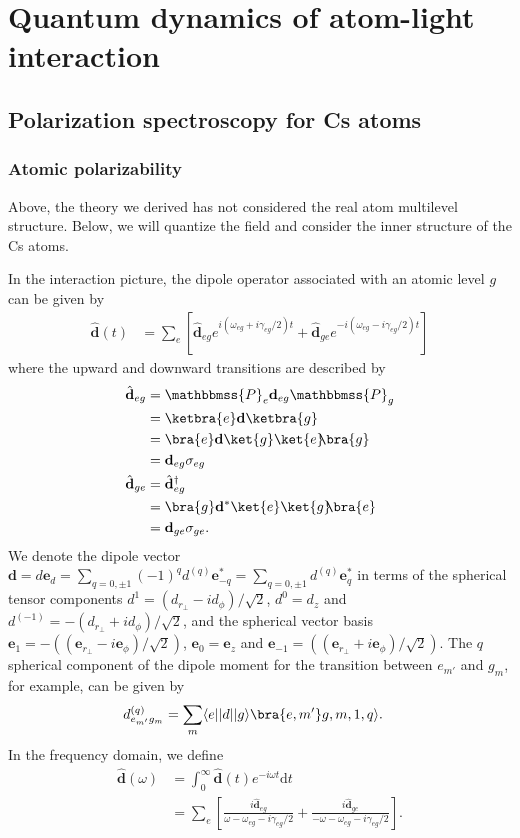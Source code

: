 \chapter{Quantum dynamics of atom-light interaction}

\section{Polarization spectroscopy for Cs atoms}
\subsection{Atomic polarizability}
Above, the theory we derived has not considered the real atom multilevel structure. Below, we will quantize the field and consider the inner structure of the Cs atoms.

In the interaction picture, the dipole operator associated with an atomic level $ g $ can be given by
\begin{align}\label{eq:dtop}
\hat{\mathbf{d}}(t) &= \sum_e \left[ \hat{\mathbf{d}}_{eg}e^{i(\omega_{eg}+i\gamma_{eg}/2)t} + \hat{\mathbf{d}}_{ge}e^{-i(\omega_{eg}-i\gamma_{eg}/2)t}\right]
\end{align}
where the upward and downward transitions are described by
\begin{align}
\hat{\mathbf{d}}_{eg} &= \mathbbmss{P}_e\mathbf{d}_{eg}\mathbbmss{P}_g\\
&= \ketbra{e} \mathbf{d}\ketbra{g}\\
&= \bra{e} \mathbf{d}\ket{g} \ket{e}\!\!\bra{g}\\
&= \mathbf{d}_{eg} \sigma_{eg}\\
\hat{\mathbf{d}}_{ge} &=\hat{\mathbf{d}}_{eg}^\dagger \\
&= \bra{g} \mathbf{d}^*\ket{e} \ket{g}\!\!\bra{e}\\
&= \mathbf{d}_{ge}\sigma_{ge}.
\end{align}
We denote the dipole vector $ \mathbf{d}=d\mathbf{e}_d=\sum_{q=0,\pm 1} (-1)^qd^{(q)}\mathbf{e}^*_{-q}=\sum_{q=0,\pm 1} d^{(q)}\mathbf{e}^*_{q} $ in terms of the spherical tensor components $ d^1=(d_{r\!_\perp}-id_{\phi})/\sqrt{2} $, $ d^0=d_z $ and $ d^{(-1)} =-(d_{r\!_\perp}+id_{\phi})/\sqrt{2} $, and the spherical vector basis $ \mathbf{e}_1=-((\mathbf{e}_{r\!_\perp}-i\mathbf{e}_{\phi})/\sqrt{2}) $, $ \mathbf{e}_0=\mathbf{e}_z $ and $ \mathbf{e}_{-1}=((\mathbf{e}_{r\!_\perp}+i\mathbf{e}_{\phi})/\sqrt{2}) $. The $ q $ spherical component of the dipole moment for the transition between $ e_{m'} $ and $ g_m $, for example, can be given by
\begin{align}
d^{(q)}_{e_{m'}g_{m}}&= \sum_m \langle e||d||g\rangle \bra{e,m'}g,m,1,q\rangle .
\end{align}
In the frequency domain, we define 
\begin{align}
\hat{\mathbf{d}}(\omega) &= \int_0^\infty \hat{\mathbf{d}}(t)e^{-i\omega t}\mathrm{d}t\\
&= \sum_e \left[ \frac{i\hat{\mathbf{d}}_{eg}}{ \omega -\omega_{eg}-i\gamma_{eg}/2 } + \frac{i\hat{\mathbf{d}}_{ge}}{ - \omega-\omega_{eg}-i\gamma_{eg}/2}\right].
\end{align}

